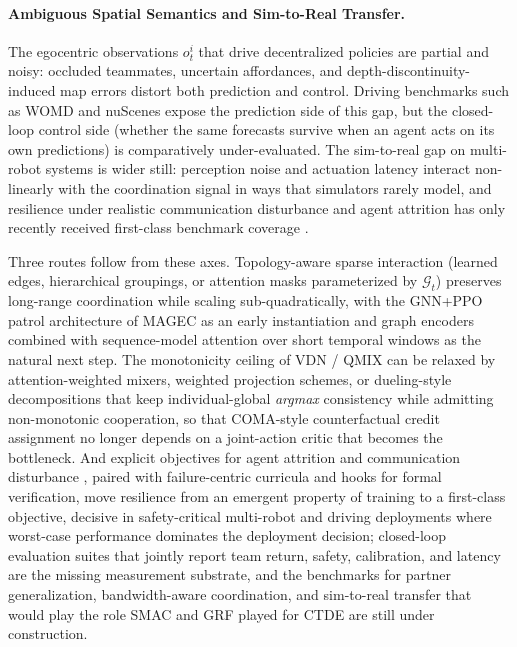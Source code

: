\paragraph{Ambiguous Spatial Semantics and Sim-to-Real Transfer.}
The egocentric observations $o^i_t$ that drive decentralized policies are partial and noisy: occluded teammates, uncertain affordances, and depth-discontinuity-induced map errors distort both prediction and control.
Driving benchmarks such as WOMD \cite{ettinger2021womd} and nuScenes \cite{caesar2020nuscenes} expose the prediction side of this gap, but the closed-loop control side (whether the same forecasts survive when an agent acts on its own predictions) is comparatively under-evaluated.
The sim-to-real gap on multi-robot systems is wider still: perception noise and actuation latency interact non-linearly with the coordination signal in ways that simulators rarely model, and resilience under realistic communication disturbance and agent attrition has only recently received first-class benchmark coverage \cite{goeckner2024magec}.

Three routes follow from these axes.
Topology-aware sparse interaction (learned edges, hierarchical groupings, or attention masks parameterized by $\mathcal{G}_t$) preserves long-range coordination while scaling sub-quadratically, with the GNN+PPO patrol architecture of MAGEC \cite{goeckner2024magec} as an early instantiation and graph encoders combined with sequence-model attention over short temporal windows as the natural next step.
The monotonicity ceiling of VDN / QMIX \cite{sunehag2018vdn,rashid2018qmix} can be relaxed by attention-weighted mixers, weighted projection schemes, or dueling-style decompositions that keep individual-global \emph{argmax} consistency while admitting non-monotonic cooperation, so that COMA-style counterfactual credit assignment \cite{foerster2018coma} no longer depends on a joint-action critic that becomes the bottleneck.
And explicit objectives for agent attrition and communication disturbance \cite{goeckner2024magec}, paired with failure-centric curricula and hooks for formal verification, move resilience from an emergent property of training to a first-class objective, decisive in safety-critical multi-robot and driving deployments \cite{ettinger2021womd,caesar2020nuscenes} where worst-case performance dominates the deployment decision; closed-loop evaluation suites that jointly report team return, safety, calibration, and latency are the missing measurement substrate, and the benchmarks for partner generalization, bandwidth-aware coordination, and sim-to-real transfer that would play the role SMAC and GRF played for CTDE are still under construction.
